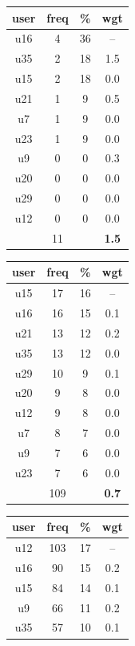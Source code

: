 \begin{table}
\centering
\begin{tabular}{ |c|c|c|c| }
	\hline
	\textbf{user} & \textbf{freq} & \textbf{\%} & \textbf{wgt} \\
	\hline
	u16 & 4 & 36 & -- \\
	u35 & 2 & 18 & 1.5 \\
	u15 & 2 & 18 & 0.0 \\
	u21 & 1 & 9 & 0.5 \\
	u7 & 1 & 9 & 0.0 \\
	u23 & 1 & 9 & 0.0 \\
	u9 & 0 & 0 & 0.3 \\
	u20 & 0 & 0 & 0.0 \\
	u29 & 0 & 0 & 0.0 \\
	u12 & 0 & 0 & 0.0 \\
	 & 11 & & \textbf{1.5} \\
	\hline
\end{tabular}
\begin{tabular}{ |c|c|c|c| }
	\hline
	\textbf{user} & \textbf{freq} & \textbf{\%} & \textbf{wgt} \\
	\hline
	u15 & 17 & 16 & -- \\
	u16 & 16 & 15 & 0.1 \\
	u21 & 13 & 12 & 0.2 \\
	u35 & 13 & 12 & 0.0 \\
	u29 & 10 & 9 & 0.1 \\
	u20 & 9 & 8 & 0.0 \\
	u12 & 9 & 8 & 0.0 \\
	u7 & 8 & 7 & 0.0 \\
	u9 & 7 & 6 & 0.0 \\
	u23 & 7 & 6 & 0.0 \\
	 & 109 & & \textbf{0.7} \\
	\hline
\end{tabular}
\begin{tabular}{ |c|c|c|c| }
	\hline
	\textbf{user} & \textbf{freq} & \textbf{\%} & \textbf{wgt} \\
	\hline
	u12 & 103 & 17 & -- \\
	u16 & 90 & 15 & 0.2 \\
	u15 & 84 & 14 & 0.1 \\
	u9 & 66 & 11 & 0.2 \\
	u35 & 57 & 10 & 0.1 \\

\end{tabular}
\end{table}
